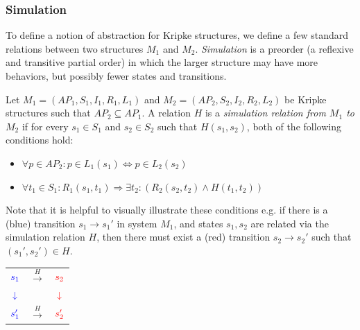 \documentclass[10pt,a4paper]{article}
\begin{document}
\subsubsection*{Simulation}
To define a notion of abstraction for Kripke structures, we define a few standard relations between two structures $M_1$ and $M_2$. \textit{Simulation} is a preorder (a reflexive and transitive partial order) in which the larger structure may have more behaviors, but possibly fewer states and transitions.

Let $M_1=(AP_1,S_1,I_1,R_1,L_1)$ and $M_2=(AP_2,S_2,I_2,R_2,L_2)$ be Kripke structures such that $AP_2 \subseteq AP_1$. A relation $H$ is a \textit{simulation relation from $M_1$ to $M_2$} if for every $s_1 \in S_1$ and $s_2 \in S_2$ such that $H(s_1,s_2)$, both of the following conditions hold:
\begin{itemize}
    \item $\forall p \in AP_2 : p \in L_1(s_1) \iff p \in L_2(s_2)$
    \item $\forall t_1 \in S_1 :  R_1(s_1,t_1) \Rightarrow \exists t_2 : (R_2(s_2,t_2) \wedge H(t_1,t_2))$
\end{itemize}
Note that it is helpful to visually illustrate these conditions e.g. if there is a (blue) transition $s_1 \rightarrow s_1'$ in system $M_1$, and states $s_1,s_2$ are related via the simulation relation $H$, then there must exist a (red) transition $s_2 \rightarrow s_2'$ such that $(s_1',s_2') \in H$.
\begin{center}
\begin{tabular}{c c c}
    $\textcolor{blue}{s_1}$ & $\overset{H}{\longrightarrow}$ & $\textcolor{red}{s_2}$ \\
    $\textcolor{blue}{\downarrow}$ &  & $\textcolor{red}{\downarrow}$ \\
    $\textcolor{blue}{s_1'}$ & $\overset{H}{\longrightarrow}$ & $\textcolor{red}{s_2'}$
\end{tabular}
\end{center}
\end{document}
